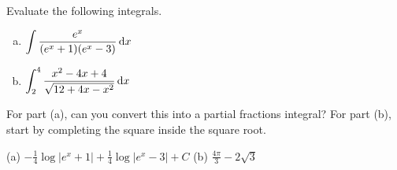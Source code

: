 \begin{question}[M105 2015A]
Evaluate the following integrals.
\begin{enumerate}[(a)]
\item
$\displaystyle\int \frac{e^x}{(e^x+1)(e^x-3)}\, \mathrm{d}x$

\item
$\displaystyle\int_2^4 \frac{x^2-4x+4}{\sqrt{12+4x-x^2}}\, \mathrm{d}x$
\end{enumerate}
\end{question}

\begin{hint}
For part (a), can you convert this into a partial fractions integral?
For part (b), start by completing the square inside the square root.
\end{hint}

\begin{answer} (a)
$\displaystyle-\frac{1}{4}\log|e^x+1| +\frac{1}{4}\log|e^x-3| + C$
\qquad (b)
$\displaystyle\frac{4\pi}{3}-2\sqrt{3}$

\end{answer}

